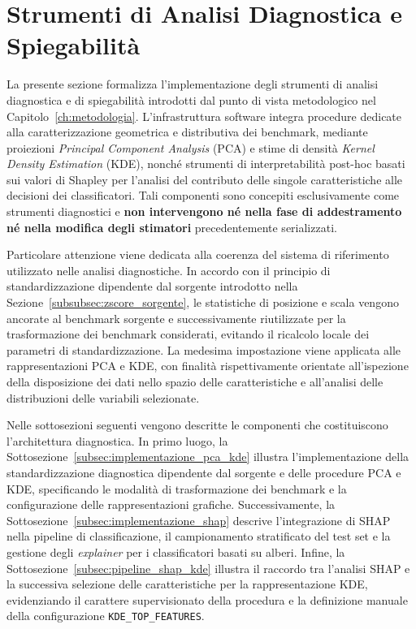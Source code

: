 \section{Strumenti di Analisi Diagnostica e Spiegabilità}
\label{sec:strumenti_analisi_diagnostica}

La presente sezione formalizza l'implementazione degli strumenti di analisi diagnostica e di spiegabilità introdotti dal punto di vista metodologico nel Capitolo~\ref{ch:metodologia}.
L'infrastruttura software integra procedure dedicate alla caratterizzazione geometrica e distributiva dei benchmark, mediante proiezioni \textit{Principal Component Analysis} (PCA) e stime di densità \textit{Kernel Density Estimation} (KDE), nonché strumenti di interpretabilità post-hoc basati sui valori di Shapley per l'analisi del contributo delle singole caratteristiche alle decisioni dei classificatori.
Tali componenti sono concepiti esclusivamente come strumenti diagnostici e \textbf{non intervengono né nella fase di addestramento né nella modifica degli stimatori} precedentemente serializzati.

Particolare attenzione viene dedicata alla coerenza del sistema di riferimento utilizzato nelle analisi diagnostiche.
In accordo con il principio di standardizzazione dipendente dal sorgente introdotto nella Sezione~\ref{subsubsec:zscore_sorgente}, le statistiche di posizione e scala vengono ancorate al benchmark sorgente e successivamente riutilizzate per la trasformazione dei benchmark considerati, evitando il ricalcolo locale dei parametri di standardizzazione.
La medesima impostazione viene applicata alle rappresentazioni PCA e KDE, con finalità rispettivamente orientate all'ispezione della disposizione dei dati nello spazio delle caratteristiche e all'analisi delle distribuzioni delle variabili selezionate.

Nelle sottosezioni seguenti vengono descritte le componenti che costituiscono l'architettura diagnostica.
In primo luogo, la Sottosezione~\ref{subsec:implementazione_pca_kde} illustra l'implementazione della standardizzazione diagnostica dipendente dal sorgente e delle procedure PCA e KDE, specificando le modalità di trasformazione dei benchmark e la configurazione delle rappresentazioni grafiche.
Successivamente, la Sottosezione~\ref{subsec:implementazione_shap} descrive l'integrazione di SHAP nella pipeline di classificazione, il campionamento stratificato del test set e la gestione degli \textit{explainer} per i classificatori basati su alberi.
Infine, la Sottosezione~\ref{subsec:pipeline_shap_kde} illustra il raccordo tra l'analisi SHAP e la successiva selezione delle caratteristiche per la rappresentazione KDE, evidenziando il carattere supervisionato della procedura e la definizione manuale della configurazione \texttt{KDE\_TOP\_FEATURES}.

